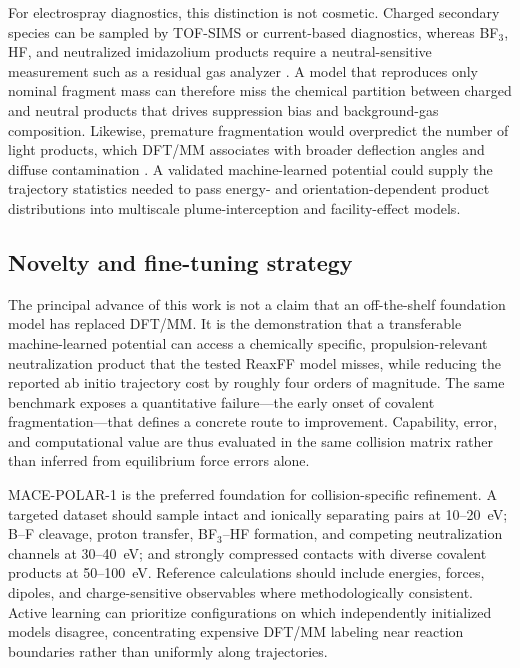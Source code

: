 \documentclass[preprint,review,12pt]{elsarticle}
\begin{document}
For electrospray diagnostics, this distinction is not cosmetic. Charged
secondary species can be sampled by TOF-SIMS or current-based diagnostics,
whereas BF$_3$, HF, and neutralized imidazolium products require a
neutral-sensitive measurement such as a residual gas analyzer
\cite{Laws2026,Shaik2024}. A model that reproduces only nominal fragment mass
can therefore miss the chemical partition between charged and neutral products
that drives suppression bias and background-gas composition. Likewise,
premature fragmentation would overpredict the number of light products, which
DFT/MM associates with broader deflection angles and diffuse contamination
\cite{Laws2026}. A validated machine-learned potential could supply the
trajectory statistics needed to pass energy- and orientation-dependent product
distributions into multiscale plume-interception and facility-effect models.

\subsection{Novelty and fine-tuning strategy}
\label{sec:fine_tuning}

The principal advance of this work is not a claim that an off-the-shelf
foundation model has replaced DFT/MM. It is the demonstration that a
transferable machine-learned potential can access a chemically specific,
propulsion-relevant neutralization product that the tested ReaxFF model
misses, while reducing the reported ab initio trajectory cost by roughly four
orders of magnitude. The same benchmark exposes a quantitative failure---the
early onset of covalent fragmentation---that defines a concrete route to
improvement. Capability, error, and computational value are thus evaluated in
the same collision matrix rather than inferred from equilibrium force errors
alone.

MACE-POLAR-1 is the preferred foundation for collision-specific refinement. A
targeted dataset should sample intact and ionically separating pairs at
10--20~eV; B--F cleavage, proton transfer, BF$_3$--HF formation, and competing
neutralization channels at 30--40~eV; and strongly compressed contacts with
diverse covalent products at 50--100~eV. Reference calculations should include
energies, forces, dipoles, and charge-sensitive observables where
methodologically consistent. Active learning can prioritize configurations on
which independently initialized models disagree, concentrating expensive
DFT/MM labeling near reaction boundaries rather than uniformly along
trajectories.
\end{document}
